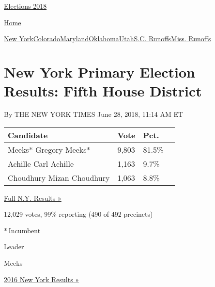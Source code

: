 \href{//www.nytimes3xbfgragh.onion}{}\href{https://www.nytimes3xbfgragh.onion/interactive/2018/us/elections/calendar-primary-results.html}{
Elections 2018}

\href{//www.nytimes3xbfgragh.onion}{ Home}

\href{https://www.nytimes3xbfgragh.onion/interactive/2018/06/26/us/elections/results-new-york-primary-elections.html}{New
York}\href{https://www.nytimes3xbfgragh.onion/interactive/2018/06/26/us/elections/results-colorado-primary-elections.html}{Colorado}\href{https://www.nytimes3xbfgragh.onion/interactive/2018/06/26/us/elections/results-maryland-primary-elections.html}{Maryland}\href{https://www.nytimes3xbfgragh.onion/interactive/2018/06/26/us/elections/results-oklahoma-primary-elections.html}{Oklahoma}\href{https://www.nytimes3xbfgragh.onion/interactive/2018/06/26/us/elections/results-utah-primary-elections-ul.html}{Utah}\href{https://www.nytimes3xbfgragh.onion/interactive/2018/06/26/us/elections/results-south-carolina-primary-runoff-elections.html}{S.C.
Runoffs}\href{https://www.nytimes3xbfgragh.onion/interactive/2018/06/26/us/elections/results-mississippi-primary-runoff-elections.html}{Miss.
Runoffs}

\hypertarget{new-york-primary-election-results-fifth-house-district}{%
\section{New York Primary Election Results: Fifth House
District}\label{new-york-primary-election-results-fifth-house-district}}

By THE NEW YORK TIMES June 28, 2018, 11:14 AM ET

\begin{longtable}[]{@{}llll@{}}
\toprule
Candidate & Vote & Pct. &\tabularnewline
\midrule
\endhead
 Meeks* Gregory Meeks* & 9,803 & 81.5\% &\tabularnewline
 Achille Carl Achille & 1,163 & 9.7\% &\tabularnewline
 Choudhury Mizan Choudhury & 1,063 & 8.8\% &\tabularnewline
\bottomrule
\end{longtable}

\href{https://www.nytimes3xbfgragh.onion/elections/results/new-york}{Full
N.Y. Results »}

12,029 votes, 99\% reporting (490 of 492 precincts)

* Incumbent

Leader

 Meeks

\href{https://www.nytimes3xbfgragh.onion/elections/results/new-york}{2016
New York Results »}

